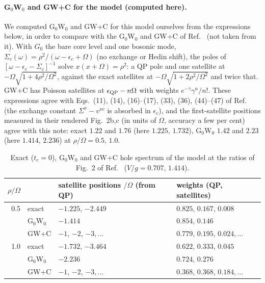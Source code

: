 \documentclass[11pt]{article}
\begin{document}
\paragraph{G$_0$W$_0$ and GW+C for the model (computed here).} We computed G$_0$W$_0$ and GW+C for this model ourselves from the expressions below, in order to compare with the G$_0$W$_0$ and GW+C of Ref.~\cite{Kocklauner2024} (not taken from it). With $G_0$ the bare core level and one bosonic mode, $\Sigma_c(\omega)=\rho^2/(\omega-\epsilon_c+\Omega)$ (no exchange or Hedin shift), the poles of $[\omega-\epsilon_c-\Sigma_c]^{-1}$ solve $x(x+\Omega)=\rho^2$: a QP pole and one satellite at $-\Omega\sqrt{1+4\rho^2/\Omega^2}$,
against the exact satellites at $-\Omega\sqrt{1+2\rho^2/\Omega^2}$ and twice that. GW+C has Poisson satellites at $\epsilon_{\rm QP}-n\Omega$ with weights $e^{-\gamma}\gamma^n/n!$. These expressions agree with Eqs.~(11), (14), (16)--(17), (33), (36), (44)--(47) of Ref.~\cite{Kocklauner2024} (the exchange constant $\Sigma^x-v^{xc}$ is absorbed in $\epsilon_c$),
and the first-satellite positions measured in their rendered Fig.~2b,c (in units of $\Omega$, accuracy a few per cent) agree with this note: exact $1.22$ and $1.76$ (here $1.225$, $1.732$), G$_0$W$_0$ $1.42$ and $2.23$ (here $1.414$, $2.236$) at $\rho/\Omega=0.5$, $1.0$.

\begin{table}[!ht]
\centering\footnotesize
\begin{tabular}{r l l l}
\toprule
$\rho/\Omega$ & & satellite positions $/\Omega$ (from QP) & weights (QP, satellites)\\
\midrule
0.5 & exact & $-1.225$, $-2.449$ & $0.825$, $0.167$, $0.008$\\
    & G$_0$W$_0$ & $-1.414$ & $0.854$, $0.146$\\
    & GW+C & $-1$, $-2$, $-3,\dots$ & $0.779$, $0.195$, $0.024,\dots$\\
1.0 & exact & $-1.732$, $-3.464$ & $0.622$, $0.333$, $0.045$\\
    & G$_0$W$_0$ & $-2.236$ & $0.724$, $0.276$\\
    & GW+C & $-1$, $-2$, $-3,\dots$ & $0.368$, $0.368$, $0.184,\dots$\\
\bottomrule
\end{tabular}
\caption{Exact ($t_c=0$), G$_0$W$_0$ and GW+C hole spectrum of the model at the ratios of Fig.~2 of Ref.~\cite{Kocklauner2024} ($V/g=0.707$, $1.414$).}
\label{tab:golze}
\end{table}
\end{document}
